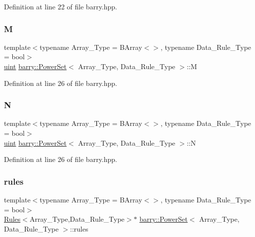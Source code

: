 Definition at line 22 of file barry.\+hpp.

\mbox{\label{classbarry_1_1_power_set_ae64182a21f9969a2c9fdf73ab23a6c5e}} 
\subsubsection{\texorpdfstring{M}{M}}
{\footnotesize\ttfamily template$<$typename Array\+\_\+\+Type  = B\+Array$<$$>$, typename Data\+\_\+\+Rule\+\_\+\+Type  = bool$>$ \\
\hyperlink{namespacebarry_a11dfc53ddb4672278319aa04f1e09a6c}{uint} \hyperlink{classbarry_1_1_power_set}{barry\+::\+Power\+Set}$<$ Array\+\_\+\+Type, Data\+\_\+\+Rule\+\_\+\+Type $>$\+::M}



Definition at line 26 of file barry.\+hpp.

\mbox{\label{classbarry_1_1_power_set_adea0f6434b17b3fc391475a11db00c2f}} 
\subsubsection{\texorpdfstring{N}{N}}
{\footnotesize\ttfamily template$<$typename Array\+\_\+\+Type  = B\+Array$<$$>$, typename Data\+\_\+\+Rule\+\_\+\+Type  = bool$>$ \\
\hyperlink{namespacebarry_a11dfc53ddb4672278319aa04f1e09a6c}{uint} \hyperlink{classbarry_1_1_power_set}{barry\+::\+Power\+Set}$<$ Array\+\_\+\+Type, Data\+\_\+\+Rule\+\_\+\+Type $>$\+::N}



Definition at line 26 of file barry.\+hpp.

\mbox{\label{classbarry_1_1_power_set_ae8eee09092e96fbefde320ba89fdcbfc}} 
\subsubsection{\texorpdfstring{rules}{rules}}
{\footnotesize\ttfamily template$<$typename Array\+\_\+\+Type  = B\+Array$<$$>$, typename Data\+\_\+\+Rule\+\_\+\+Type  = bool$>$ \\
\hyperlink{classbarry_1_1_rules}{Rules}$<$Array\+\_\+\+Type,Data\+\_\+\+Rule\+\_\+\+Type$>$$\ast$ \hyperlink{classbarry_1_1_power_set}{barry\+::\+Power\+Set}$<$ Array\+\_\+\+Type, Data\+\_\+\+Rule\+\_\+\+Type $>$\+::rules}



